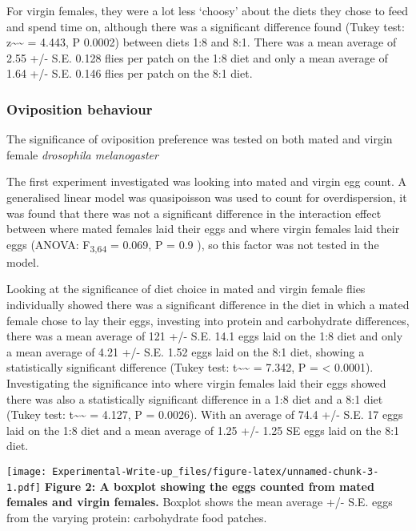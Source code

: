\documentclass[
]{article}
\begin{document}
For virgin females, they were a lot less `choosy' about the diets they
chose to feed and spend time on, although there was a significant
difference found (Tukey test: z\textasciitilde\textasciitilde{} = 4.443,
P 0.0002) between diets 1:8 and 8:1. There was a mean average of 2.55
+/- S.E. 0.128 flies per patch on the 1:8 diet and only a mean average
of 1.64 +/- S.E. 0.146 flies per patch on the 8:1 diet.

\hypertarget{oviposition-behaviour}{%
\subsubsection{Oviposition behaviour}\label{oviposition-behaviour}}

The significance of oviposition preference was tested on both mated and
virgin female \emph{drosophila melanogaster}

The first experiment investigated was looking into mated and virgin egg
count. A generalised linear model was quasipoisson was used to count for
overdispersion, it was found that there was not a significant difference
in the interaction effect between where mated females laid their eggs
and where virgin females laid their eggs (ANOVA: F\textsubscript{3,64} =
0.069, P = 0.9 ), so this factor was not tested in the model.

Looking at the significance of diet choice in mated and virgin female
flies individually showed there was a significant difference in the diet
in which a mated female chose to lay their eggs, investing into protein
and carbohydrate differences, there was a mean average of 121 +/- S.E.
14.1 eggs laid on the 1:8 diet and only a mean average of 4.21 +/- S.E.
1.52 eggs laid on the 8:1 diet, showing a statistically significant
difference (Tukey test: t\textasciitilde\textasciitilde{} = 7.342, P =
\textless{} 0.0001). Investigating the significance into where virgin
females laid their eggs showed there was also a statistically
significant difference in a 1:8 diet and a 8:1 diet (Tukey test:
t\textasciitilde\textasciitilde{} = 4.127, P = 0.0026). With an average
of 74.4 +/- S.E. 17 eggs laid on the 1:8 diet and a mean average of 1.25
+/- 1.25 SE eggs laid on the 8:1 diet.

\texttt{[image: Experimental-Write-up\_files/figure-latex/unnamed-chunk-3-1.pdf]}
\textbf{Figure 2: A boxplot showing the eggs counted from mated females
and virgin females.} Boxplot shows the mean average +/- S.E. eggs from
the varying protein: carbohydrate food patches.
\end{document}
